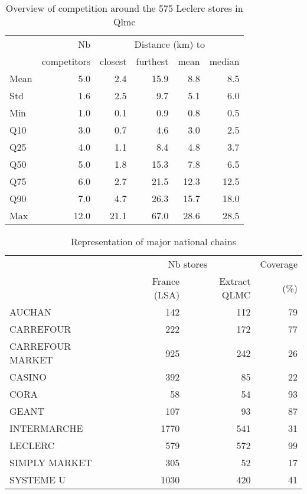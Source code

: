 \documentclass[english]{article}
\begin{document}
\begin{table}[H]
\renewcommand{\arraystretch}{0.7}%
\caption{Overview of competition around the 575 Leclerc stores in Qlmc}\label{tab:qlmc_comp}
\small
\begin{tabular}{lr|rrrr}
\toprule
\toprule
{}         & Nb          &    \multicolumn{4}{c}{Distance (km) to} \\
{}         & competitors &    closest & furthest & mean & median \\
\midrule
Mean  &   5.0 &   2.4 &  15.9 &   8.8 &     8.5 \\
Std   &   1.6 &   2.5 &   9.7 &   5.1 &     6.0 \\
Min   &   1.0 &   0.1 &   0.9 &   0.8 &     0.5 \\
Q10   &   3.0 &   0.7 &   4.6 &   3.0 &     2.5 \\
Q25   &   4.0 &   1.1 &   8.4 &   4.8 &     3.7 \\
Q50   &   5.0 &   1.8 &  15.3 &   7.8 &     6.5 \\
Q75   &   6.0 &   2.7 &  21.5 &  12.3 &    12.5 \\
Q90   &   7.0 &   4.7 &  26.3 &  15.7 &    18.0 \\
Max   &  12.0 &  21.1 &  67.0 &  28.6 &    28.5 \\
\bottomrule
\bottomrule
\end{tabular}
\end{table}

\begin{table}[H]
\renewcommand{\arraystretch}{0.7}%
\caption{Representation of major national chains}\label{tab:qlmc_chain_repr}
\small
\begin{tabular}{lrrr}
\toprule
{} &  \multicolumn{2}{c}{Nb stores}   &  Coverage      \\
{} &   France (LSA) & Extract QLMC    & (\%)           \\
\midrule
AUCHAN           &            142 &             112 &            79 \\
CARREFOUR        &            222 &             172 &            77 \\
CARREFOUR MARKET &            925 &             242 &            26 \\
CASINO           &            392 &              85 &            22 \\
CORA             &             58 &              54 &            93 \\
GEANT            &            107 &              93 &            87 \\
INTERMARCHE      &           1770 &             541 &            31 \\
LECLERC          &            579 &             572 &            99 \\
SIMPLY MARKET    &            305 &              52 &            17 \\
SYSTEME U        &           1030 &             420 &            41 \\
\bottomrule
\bottomrule
\end{tabular}
\end{table}
\end{document}
